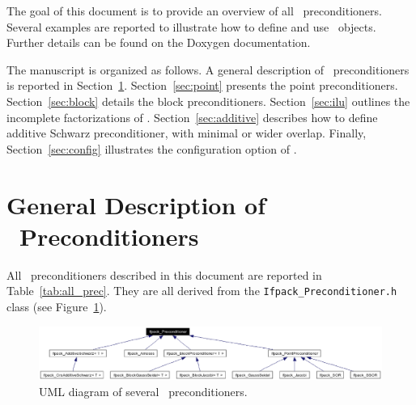 \smallskip

The goal of this document is to provide an overview of all \ifpack\
  preconditioners. Several examples are reported to illustrate how to define
  and use \ifpack\ objects. Further details can be found on the Doxygen
  documentation.

The manuscript is organized as follows. A general description of \ifpack\
  preconditioners is reported in Section~\ref{sec:prec}.
Section~\ref{sec:point} presents the point preconditioners. 
Section~\ref{sec:block} details the block preconditioners.
Section~\ref{sec:ilu} outlines the incomplete factorizations of \ifpack.
Section~\ref{sec:additive} describes how to define additive Schwarz 
preconditioner, with minimal or wider overlap. 
Finally, Section~\ref{sec:config}
illustrates the configuration option of \ifpack. 

\section{General Description of \ifpack\ Preconditioners}
\label{sec:prec}

All \ifpack\ preconditioners described in this document
are reported in Table~\ref{tab:all_prec}. They are all derived from the 
\verb!Ifpack_Preconditioner.h!
class (see Figure~\ref{fig:if_prec}).

\begin{figure}
\begin{center}
\includegraphics[width=15cm]{Ifpack_Preconditioner.eps}
\caption{UML diagram of  several \ifpack\ preconditioners.}
\label{fig:if_prec}
\end{center}
\end{figure}

